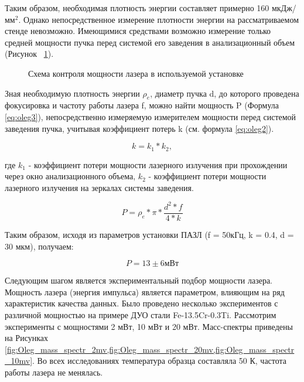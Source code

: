 Таким образом, необходимая плотность энергии составляет примерно 160 мкДж/мм$^{2}$. 
Однако непосредственное измерение плотности энергии на рассматриваемом стенде  невозможно. Имеющимися средствами возможно измерение только средней мощности пучка перед системой его заведения в анализационный объем (Рисунок~ \cref{fig:Oleg_laser_schema}).

\begin{figure}[htb]
	\caption{Схема контроля мощности лазера в используемой установке}
	\label{fig:Oleg_laser_schema}
\end{figure}

Зная необходимую плотность энергии $\rho_{e}$, диаметр пучка d, до которого проведена фокусировка и частоту работы лазера f, можно найти мощность P (Формула \cref{eq:oleg3}), непосредственно измеряемую измерителем мощности перед системой заведения пучка, учитывая коэффициент потерь k (см. формула \cref{eq:oleg2}).

\begin{equation}
	\label{eq:oleg2}
	k = k_{1} * k_{2},
\end{equation}

где $k_{1}$ - коэффициент потери мощности лазерного излучения при прохождении через окно анализационного объема, $k_{2}$ - коэффициент потери мощности лазерного излучения на зеркалах системы заведения.

\begin{equation}
	\label{eq:oleg3}
	P = \rho_{e}*\pi*\frac{d^{2}*f}{4*k}
\end{equation}

Таким образом, исходя из параметров установки ПАЗЛ (f = 50кГц, k = 0.4, d = 30 мкм), получаем:

\begin{equation}
	\label{eq:oleg4}
	P = 13 \pm 6 мВт
\end{equation}	

Следующим шагом является экспериментальный подбор мощности лазера. Мощность лазера (энергия импульса) является параметром, влияющим на ряд характеристик качества данных. Было проведено несколько экспериментов с различной мощностью на примере ДУО стали Fe-13.5Cr-0.3Ti. Рассмотрим эксперименты с мощностями 2 мВт, 10 мВт и 20 мВт. Масс-спектры приведены на Рисунках \cref{fig:Oleg_mass_spectr_2mv,fig:Oleg_mass_spectr_20mv,fig:Oleg_mass_spectr_10mv}. Во всех исследованиях температура образца составляла 50 К, частота работы лазера не менялась.

